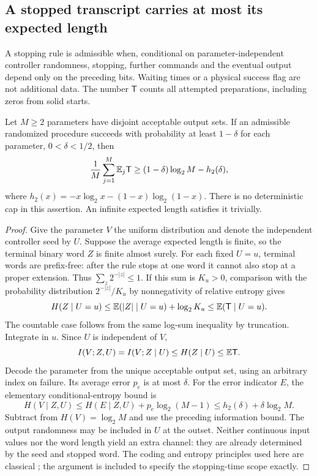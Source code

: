 \subsection{A stopped transcript carries at most its expected length}
A stopping rule is admissible when, conditional on parameter-independent
controller randomness, stopping, further commands and the eventual
output depend only on the preceding bits. Waiting times or a physical
success flag are not additional data. The number $\mathsf T$ counts
all attempted preparations, including zeros from solid starts.

\begin{lemma}\label{lem:sequential}
Let $M\ge2$ parameters have disjoint acceptable output sets. If an
admissible randomized procedure succeeds with probability at least
$1-\delta$ for each parameter, $0<\delta<1/2$, then
\begin{equation}\label{eq:sequential-information}
 \frac1M\sum_{j=1}^M\mathbb E_j\mathsf T
 \ge (1-\delta)\log_2M-h_2(\delta),
\end{equation}
where $h_2(x)=-x\log_2x-(1-x)\log_2(1-x)$. There is no deterministic
cap in this assertion. An infinite expected length satisfies it
trivially.
\end{lemma}
\begin{proof}
Give the parameter $V$ the uniform distribution and denote the
independent controller seed by $U$. Suppose the average expected length
is finite, so the terminal binary word $Z$ is finite almost surely.
For each fixed $U=u$, terminal words are prefix-free: after the rule
stops at one word it cannot also stop at a proper extension. Thus
$\sum_z2^{-|z|}\le1$. If this sum is $K_u>0$, comparison with the
probability distribution $2^{-|z|}/K_u$ by nonnegativity of relative
entropy gives
\[
 H(Z\mid U=u)\le\mathbb E(|Z|\mid U=u)+\log_2K_u
                    \le\mathbb E(\mathsf T\mid U=u).
\]
The countable case follows from the same log-sum inequality by
truncation. Integrate in $u$. Since $U$ is independent of $V$,
\[
 I(V;Z,U)=I(V;Z\mid U)\le H(Z\mid U)\le\mathbb E\mathsf T.
\]
Decode the parameter from the unique acceptable output set, using an
arbitrary index on failure. Its average error $p_e$ is at most $\delta$.
For the error indicator $E$, the elementary conditional-entropy bound is
\[
 H(V\mid Z,U)\le H(E\mid Z,U)+p_e\log_2(M-1)
 \le h_2(\delta)+\delta\log_2M.
\]
Subtract from $H(V)=\log_2M$ and use the preceding information bound.
The output randomness may be included in $U$ at the outset. Neither
continuous input values nor the word length yield an extra channel:
they are already determined by the seed and stopped word. The coding
and entropy principles used here are classical \cite{Shannon}; the
argument is included to specify the stopping-time scope exactly.
\end{proof}

